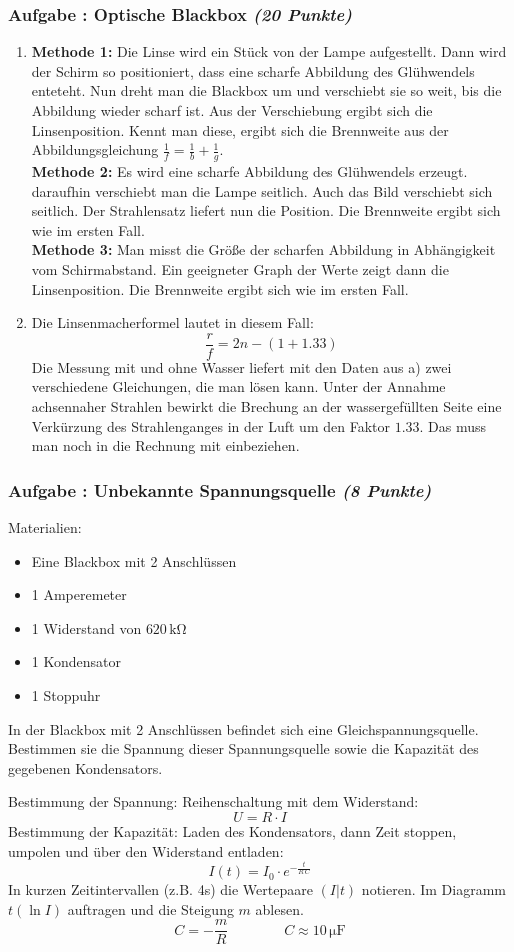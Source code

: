 \documentclass[12pt,a4paper]{article}
\newcommand{\unit}[1]{\,\mathrm{#1}}
\newenvironment{abcenum}{\renewcommand{\labelenumi}{(\alph{enumi})} \begin{enumerate}}{\end{enumerate}\renewcommand{\labelenumi}{\theenumi .}}
\newcounter{numlabel}
\newenvironment{problem}[2]{\stepcounter{numlabel} \vspace{1ex} \subsubsection*{Aufgabe \the\value{numlabel}: #1 \emph{(#2 Punkte)}} \renewcommand{\Currentlabel}{Aufgabe \the\value{numlabel}: #1}}{

}
\begin{document}
\begin{problem}{Optische Blackbox}{20}
\begin{expsolution}
\begin{abcenum}
 \item \textbf{Methode 1:} Die Linse wird ein Stück von der Lampe aufgestellt. Dann wird der Schirm so positioniert, dass eine scharfe Abbildung des Glühwendels enteteht. Nun dreht man die Blackbox um und verschiebt sie so weit, bis die Abbildung wieder scharf ist. Aus der Verschiebung ergibt sich die Linsenposition. Kennt man diese, ergibt sich die Brennweite aus der Abbildungsgleichung $\frac 1 f = \frac 1 b + \frac 1 g$.\\
 \textbf{Methode 2:} Es wird eine scharfe Abbildung des Glühwendels erzeugt. daraufhin verschiebt man die Lampe seitlich. Auch das Bild verschiebt sich seitlich. Der Strahlensatz liefert nun die Position. Die Brennweite ergibt sich wie im ersten Fall.\\
 \textbf{Methode 3:} Man misst die Größe der scharfen Abbildung in Abhängigkeit vom Schirmabstand. Ein geeigneter Graph der Werte zeigt dann die Linsenposition. Die Brennweite ergibt sich wie im ersten Fall.
 \item Die Linsenmacherformel lautet in diesem Fall:
\[
 \frac r f = 2n-(1+1.33)
\]
Die Messung mit und ohne Wasser liefert mit den Daten aus a) zwei verschiedene Gleichungen, die man lösen kann. Unter der Annahme achsennaher Strahlen bewirkt die Brechung an der wassergefüllten Seite eine Verkürzung des Strahlenganges in der Luft um den Faktor $1.33$. Das muss man noch in die Rechnung mit einbeziehen.
\end{abcenum}
\end{expsolution}
\end{problem}



\begin{problem}{Unbekannte Spannungsquelle}{8}
Materialien:
\begin{itemize}
\item Eine Blackbox mit 2 Anschlüssen
\item 1 Amperemeter
\item 1 Widerstand von $620 \unit{k\Omega}$
\item 1 Kondensator
\item 1 Stoppuhr
\end{itemize}
In der Blackbox  mit 2 Anschlüssen befindet sich eine Gleichspannungsquelle. Bestimmen sie die Spannung dieser Spannungsquelle sowie die Kapazität des gegebenen Kondensators.
\begin{expsolution}
Bestimmung der Spannung: Reihenschaltung mit dem Widerstand:
\[
U = R\cdot I
\]
Bestimmung der Kapazität: Laden des Kondensators, dann Zeit stoppen, umpolen und über den Widerstand entladen:
\[
I(t) = I_0\cdot e^{-\frac{t}{R\,C}}
\]
In kurzen Zeitintervallen (z.B. 4s) die Wertepaare $(I|t)$ notieren. Im Diagramm $t(\ln I)$ auftragen und die Steigung $m$ ablesen.
\[
C = -\frac m R \qquad\qquad C \approx 10\unit{\mu F}
\]
\end{expsolution}
\end{problem}
\end{document}
